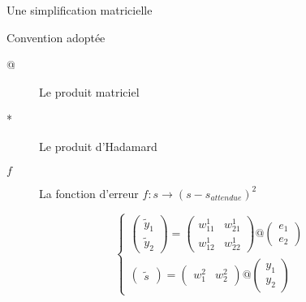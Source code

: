 \begin{frame}{Une simplification matricielle}
    \begin{block}{Convention adoptée}
        \begin{description}
            \item[@] Le produit matriciel
            \item[*] Le produit d'Hadamard
            \item[$f$] La fonction d'erreur $f:s \rightarrow (s-s_{attendue})^2$
        \end{description}
    \end{block}
    \begin{equation}
        \begin{cases}
            \begin{pmatrix}
                \tilde{y}_1 \\
                \tilde{y}_2
            \end{pmatrix}
            =
            \begin{pmatrix}
                w^1_{11} & w^1_{21} \\
                w^1_{12} & w^1_{22}
            \end{pmatrix}
            @
            \begin{pmatrix}
                e_1 \\
                e_2
            \end{pmatrix}\\
            \begin{pmatrix}
                \tilde{s}
            \end{pmatrix}
            =
            \begin{pmatrix}
                w^2_{1} & w^2_{2}
            \end{pmatrix}
            @
            \begin{pmatrix}
                y_1 \\
                y_2
            \end{pmatrix}
        \end{cases}
    \end{equation}
\end{frame}

